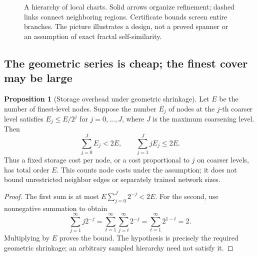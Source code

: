 \documentclass[11pt,a4paper]{article}
\theoremstyle{definition}
\newtheorem{proposition}[theorem]{Proposition}
\theoremstyle{definition}
\theoremstyle{remark}\newtheorem{remark}[theorem]{Remark}
\begin{document}
\begin{figure}[htbp]
\centering
{}
\caption{A hierarchy of local charts. Solid arrows organize refinement; dashed links connect neighboring regions. Certificate bounds screen entire branches. The picture illustrates a design, not a proved spanner or an assumption of exact fractal self-similarity.}
\label{fig:multiscaleweb}
\end{figure}
\FloatBarrier

\subsection{The geometric series is cheap; the finest cover may be large}

\begin{proposition}[Storage overhead under geometric shrinkage]\label{prop:treestorage}
Let $E$ be the number of finest-level nodes. Suppose the number $E_j$ of nodes at the $j$-th coarser level satisfies $E_j\le E/2^j$ for $j=0,\ldots,J$, where $J$ is the maximum coarsening level. Then
\[
\sum_{j=0}^{J}E_j<2E,
\qquad
\sum_{j=1}^{J}jE_j\le2E.
\]
Thus a fixed storage cost per node, or a cost proportional to $j$ on coarser levels, has total order $E$. This counts node costs under the assumption; it does not bound unrestricted neighbor edges or separately trained network sizes.
\end{proposition}
\begin{proof}
The first sum is at most $E\sum_{j=0}^{J}2^{-j}<2E$. For the second, use nonnegative summation to obtain
\[
\sum_{j=1}^{\infty}j2^{-j}
=\sum_{t=1}^{\infty}\sum_{j=t}^{\infty}2^{-j}
=\sum_{t=1}^{\infty}2^{1-t}=2.
\]
Multiplying by $E$ proves the bound. The hypothesis is precisely the required geometric shrinkage; an arbitrary sampled hierarchy need not satisfy it.
\end{proof}
\end{document}
